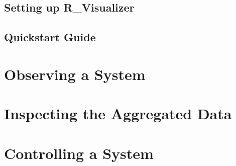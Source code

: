 \documentclass[12pt,a4paper]{scrartcl}
\begin{document}
\subsection{Setting up R\_Visualizer}
\label{subsec:GettingStartedSetup}

\subsection{Quickstart Guide}
\label{subsec:GettingStartedQuickStart}

\section{Observing a System}
\label{sec:Observing}

\section{Inspecting the Aggregated Data}
\label{sec:Inspecting}

\section{Controlling a System}
\label{sec:Controlling}
\end{document}
